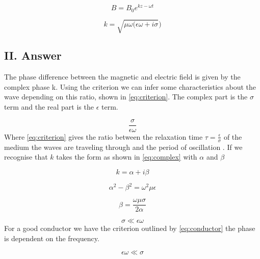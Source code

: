 \documentclass[12pt]{article}
\begin{document}
\begin{equation}
\label{eq:planewave}
B=B_{0}e^{kz-\omega{t}}
\end{equation}

\begin{equation}
\label{eq:relation}
k=\sqrt{\mu\omega(\epsilon\omega+i\sigma})
\end{equation}


\subsection*{II. Answer}

\noindent
The phase difference between the magnetic and electric field is given by the complex phase  k. Using the criterion we can infer some characteristics about the wave depending on this ratio, shown in \cref{eq:criterion}.  The complex part is the $\sigma$ term and the real part is the $\epsilon$ term.

\begin{equation}
\label{eq:criterion}
\frac{\sigma}{\epsilon\omega}
\end{equation}
\noindent
Where \cref{eq:criterion} gives the ratio between the relaxation time $\tau=\frac{\epsilon}{\sigma}$  of the medium the waves are traveling through and the period of oscillation . If we recognise that $k$ takes the form as shown in \cref{eq:complex} with $\alpha$ and $\beta$

\begin{equation}
\label{eq:complex}
k=\alpha+i\beta
\end{equation}

\begin{equation}
\label{eq:a}
\alpha^{2}-\beta^{2}=\omega^{2}\mu\epsilon
\end{equation}

\begin{equation}
\label{eq:b}
\beta=\frac{\omega\mu\sigma}{2\alpha}
\end{equation}

\begin{equation}
\label{eq:insulator}
\sigma \ll \epsilon\omega
\end{equation}
\noindent
For a good conductor we have the criterion outlined by \cref{eq:conductor} the phase is dependent on the frequency.

\begin{equation}
\label{eq:conductor}
\epsilon\omega \ll \sigma
\end{equation}
\end{document}
